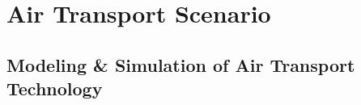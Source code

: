 
\section{Air Transport Scenario}
\label{sec:air_rail_scenario}

\subsection{Modeling \& Simulation of Air Transport Technology}
\label{sec:modeling-of-technology}




